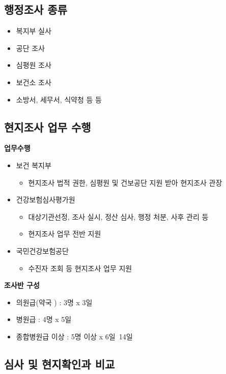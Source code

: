 \subsection{행정조사 종류}
\begin{itemize}\tightlist
\item 복지부 실사
\item 공단 조사
\item 심평원 조사 
\item 보건소 조사 
\item 소방서, 세무서, 식약청 등 등
\end{itemize}

\subsection{현지조사 업무 수행}
\textbf{업무수행}
\begin{itemize}\tightlist
\item 보건 복지부
	\begin{itemize}\tightlist
	\item 현지조사 법적 권한, 심평원 및 건보공단 지원 받아 현지조사 관장
	\end{itemize}
\item 건강보험심사평가원
	\begin{itemize}\tightlist
	\item 대상기관선정, 조사 실시, 정산 심사, 행정 처분, 사후 관리 등
	\item 현지조사 업무 전반 지원
	\end{itemize}
\item 국민건강보험공단
	\begin{itemize}\tightlist
	\item 수진자 조회 등 현지조사 업무 지원
	\end{itemize}	
\end{itemize}

\textbf{조사반 구성}
\begin{itemize}\tightlist
\item 의원급(약국 ) : 3명 x 3일 
\item 병원급 : 4명 x 5일
\item 종합병원급 이상 : 5명 이상 x 6일~14일
\end{itemize}
\subsection{심사 및 현지확인과 비교}
\par
\medskip

